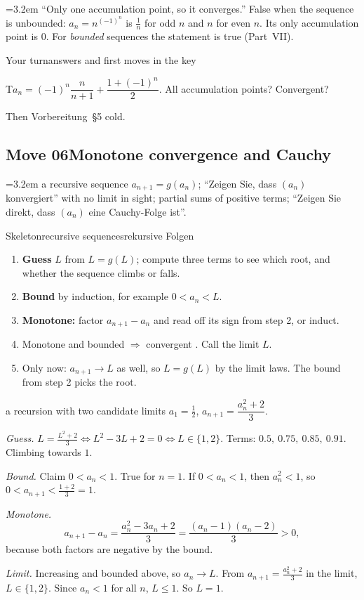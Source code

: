 \documentclass{kaelearn}
\newcounter{task}
\renewcommand\thetask{T\twodigit{\arabic{task}}}
\newcommand\task[1]{\par\smallskip\noindent\refstepcounter{task}\label{#1}%
  {\tek\fontsize{9.5}{10}\selectfont\color{klhi}\thetask}\hspace{7pt}}
\newenvironment{yourturn}{\begin{panel}{Your turn}{answers and first moves in the key}{}}{\end{panel}}
\newcommand\when[1]{\par\smallskip\noindent\hangindent=3.2em\hangafter=1%
  \makebox[3.2em][l]{\color{kldim}\pix{When}}#1\par\smallskip}
\newcommand\trap[1]{\par\smallskip\noindent\hangindent=3.2em\hangafter=1%
  \makebox[3.2em][l]{\color{kldim}\pix{Trap}}#1\par}
\begin{document}
\trap{``Only one accumulation point, so it converges.'' False when the sequence is unbounded: $a_n=n^{(-1)^n}$ is $\frac1n$
for odd $n$ and $n$ for even $n$. Its only accumulation point is $0$. For \emph{bounded} sequences the statement is true
(Part~VII).}

\begin{yourturn}
\task{t:hp}$a_n=(-1)^n\dfrac n{n+1}+\dfrac{1+(-1)^n}2$. All accumulation points? Convergent?
\par\smallskip\noindent Then Vorbereitung~§5 cold.
\end{yourturn}

\subsection{Move 06\quad Monotone convergence and Cauchy}
\when{a recursive sequence $a_{n+1}=g(a_n)$; ``Zeigen Sie, dass $(a_n)$ konvergiert'' with no limit in sight; partial sums of
positive terms; ``Zeigen Sie direkt, dass $(a_n)$ eine Cauchy-Folge ist''.}

\begin{panel}[unbreakable]{Skeleton}{recursive sequences}{rekursive Folgen}
\begin{enumerate}
  \item \textbf{Guess} $L$ from $L=g(L)$; compute three terms to see which root, and whether the sequence climbs or falls.
  \item \textbf{Bound} by induction, for example $0<a_n<L$.
  \item \textbf{Monotone:} factor $a_{n+1}-a_n$ and read off its sign from step 2, or induct.
  \item Monotone and bounded $\Rightarrow$ convergent . Call the limit $L$.
  \item Only now: $a_{n+1}\to L$ as well, so $L=g(L)$ by the limit laws. The bound from step 2 picks the root.
\end{enumerate}
\end{panel}

\begin{example}{a recursion with two candidate limits}
$a_1=\frac12$, $a_{n+1}=\dfrac{a_n^2+2}3$.

\emph{Guess.} $L=\frac{L^2+2}3\iff L^2-3L+2=0\iff L\in\{1,2\}$. Terms: $0.5,\ 0.75,\ 0.85,\ 0.91$. Climbing towards $1$.

\emph{Bound.} Claim $0<a_n<1$. True for $n=1$. If $0<a_n<1$, then $a_n^2<1$, so $0<a_{n+1}<\frac{1+2}3=1$.

\emph{Monotone.}
\[ a_{n+1}-a_n=\frac{a_n^2-3a_n+2}3=\frac{(a_n-1)(a_n-2)}3>0, \]
because both factors are negative by the bound.

\emph{Limit.} Increasing and bounded above, so $a_n\to L$. From $a_{n+1}=\frac{a_n^2+2}3$ in the limit, $L\in\{1,2\}$. Since
$a_n<1$ for all $n$, $L\le1$. So $L=1$.
\end{example}
\end{document}
